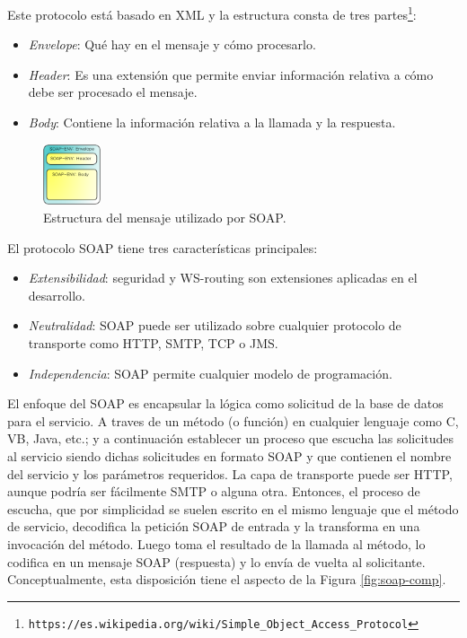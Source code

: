 \documentclass[conference]{IEEEtran}
\begin{document}
Este protocolo está basado en XML y la estructura consta de tres
partes\footnote{\texttt{https://es.wikipedia.org/wiki/Simple\_Object\_Access\_Protocol}}:
\begin{itemize}
\item\emph{Envelope}: Qué hay en el mensaje y cómo procesarlo.
\item\emph{Header}: Es una extensión que permite enviar información
  relativa a cómo debe ser procesado el mensaje.
\item\emph{Body}: Contiene la información relativa a la llamada y la
  respuesta.
\end{itemize}

\begin{figure}[!t]
\centering
  \includegraphics[width=0.15\textwidth]{img/soap}
  \caption{Estructura del mensaje utilizado por SOAP.}
  \label{fig:soap-env}
\end{figure}

El protocolo SOAP tiene tres características principales:
\begin{itemize}
\item\emph{Extensibilidad}: seguridad y WS-routing son extensiones aplicadas
  en el desarrollo.
\item\emph{Neutralidad}: SOAP puede ser utilizado sobre cualquier protocolo
  de transporte como HTTP, SMTP, TCP o JMS.
\item\emph{Independencia}: SOAP permite cualquier modelo de programación.
\end{itemize}

El enfoque del SOAP\cite{SOA4} es encapsular la lógica como solicitud
de la base
de datos para el servicio. A traves de un método (o función) en
cualquier lenguaje como C, VB, Java, etc.; y a continuación establecer
un proceso que escucha las
solicitudes al servicio siendo dichas solicitudes en formato SOAP y
que contienen el nombre del servicio y los parámetros requeridos. La
capa de transporte puede ser HTTP, aunque podría ser fácilmente SMTP o
alguna otra. Entonces, el proceso de escucha, que por simplicidad se
suelen escrito en el mismo lenguaje que el método de servicio,
decodifica la petición SOAP de entrada y la transforma en una
invocación del método.
Luego toma el resultado de la llamada al método, lo codifica en un
mensaje SOAP (respuesta) y lo envía de vuelta al
solicitante. Conceptualmente, esta disposición tiene el aspecto de la
Figura \ref{fig:soap-comp}.
\end{document}

